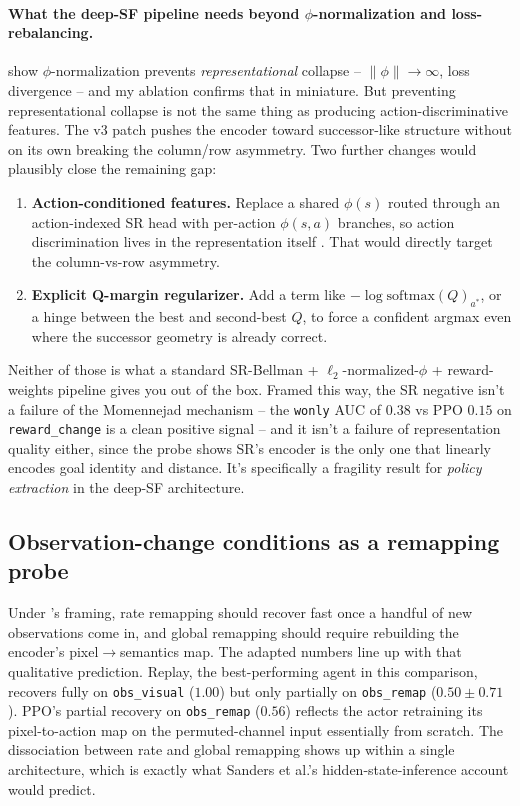 \documentclass{article}
\begin{document}
\paragraph{What the deep-SF pipeline needs beyond $\phi$-normalization and loss-rebalancing.} \citet{lehnert2024sf} show $\phi$-normalization prevents \emph{representational} collapse -- $\|\phi\|\rightarrow\infty$, loss divergence -- and my ablation confirms that in miniature. But preventing representational collapse is not the same thing as producing action-discriminative features. The v3 patch pushes the encoder toward successor-like structure without on its own breaking the column/row asymmetry. Two further changes would plausibly close the remaining gap:
\begin{enumerate}
  \item \textbf{Action-conditioned features.} Replace a shared $\phi(s)$ routed through an action-indexed SR head with per-action $\phi(s,a)$ branches, so action discrimination lives in the representation itself \citep{barreto2017sf,lehnert2024sf}. That would directly target the column-vs-row asymmetry.
  \item \textbf{Explicit Q-margin regularizer.} Add a term like $-\log\mathrm{softmax}(Q)_{a^*}$, or a hinge between the best and second-best $Q$, to force a confident argmax even where the successor geometry is already correct.
\end{enumerate}
Neither of those is what a standard SR-Bellman + $\ell_2$-normalized-$\phi$ + reward-weights pipeline gives you out of the box. Framed this way, the SR negative isn't a failure of the Momennejad mechanism -- the \texttt{wonly} AUC of $0.38$ vs PPO $0.15$ on \texttt{reward\_change} is a clean positive signal -- and it isn't a failure of representation quality either, since the probe shows SR's encoder is the only one that linearly encodes goal identity and distance. It's specifically a fragility result for \emph{policy extraction} in the deep-SF architecture.

\subsection{Observation-change conditions as a remapping probe}

Under \citet{sanders2020remap}'s framing, rate remapping should recover fast once a handful of new observations come in, and global remapping should require rebuilding the encoder's pixel$\rightarrow$semantics map. The adapted numbers line up with that qualitative prediction. Replay, the best-performing agent in this comparison, recovers fully on \texttt{obs\_visual} ($1.00$) but only partially on \texttt{obs\_remap} ($0.50\pm0.71$). PPO's partial recovery on \texttt{obs\_remap} ($0.56$) reflects the actor retraining its pixel-to-action map on the permuted-channel input essentially from scratch. The dissociation between rate and global remapping shows up within a single architecture, which is exactly what Sanders et al.'s hidden-state-inference account would predict.
\end{document}
